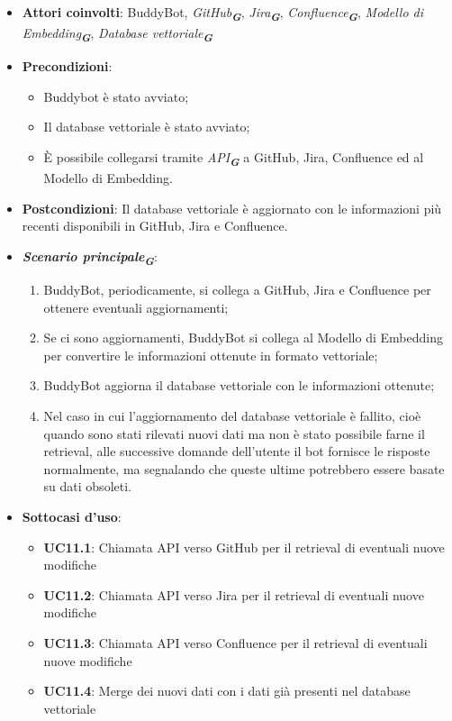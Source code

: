 \begin{itemize}
    \item \textbf{Attori coinvolti}: BuddyBot, \emph{GitHub}\textsubscript{\textbf{\textit{G}}}, \emph{Jira}\textsubscript{\textbf{\textit{G}}}, 
    \emph{Confluence}\textsubscript{\textbf{\textit{G}}}, \emph{Modello di Embedding}\textsubscript{\textbf{\textit{G}}}, 
    \emph{Database vettoriale}\textsubscript{\textbf{\textit{G}}}
    \item \textbf{Precondizioni}: 
    \begin{itemize}
        \item Buddybot è stato avviato;
        \item Il database vettoriale è stato avviato;
        \item È possibile collegarsi tramite \emph{API}\textsubscript{\textbf{\textit{G}}} a GitHub, Jira, Confluence ed al Modello di Embedding.
    \end{itemize}
    \item \textbf{Postcondizioni}: Il database vettoriale è aggiornato con le informazioni più recenti disponibili in GitHub, Jira e Confluence.
    \item \textbf{\emph{Scenario principale}\textsubscript{\textbf{\textit{G}}}}:
    \begin{enumerate}
        \item BuddyBot, periodicamente, si collega a GitHub, Jira e Confluence per ottenere eventuali aggiornamenti;
        \item Se ci sono aggiornamenti, BuddyBot si collega al Modello di Embedding per convertire le informazioni ottenute in formato vettoriale;
        \item BuddyBot aggiorna il database vettoriale con le informazioni ottenute;
        \item Nel caso in cui l'aggiornamento del database vettoriale è fallito, cioè quando sono stati rilevati nuovi dati ma non è stato possibile 
        farne il retrieval, alle successive domande dell'utente il bot fornisce le risposte normalmente, ma segnalando che queste ultime potrebbero 
        essere basate su dati obsoleti.
    \end{enumerate}
    \item \textbf{Sottocasi d'uso}:
    \begin{itemize}
        \item \textbf{UC11.1}: Chiamata API verso GitHub per il retrieval di eventuali nuove modifiche
        \item \textbf{UC11.2}: Chiamata API verso Jira per il retrieval di eventuali nuove modifiche
        \item \textbf{UC11.3}: Chiamata API verso Confluence per il retrieval di eventuali nuove modifiche
        \item \textbf{UC11.4}: Merge dei nuovi dati con i dati già presenti nel database vettoriale
    \end{itemize}
\end{itemize}



